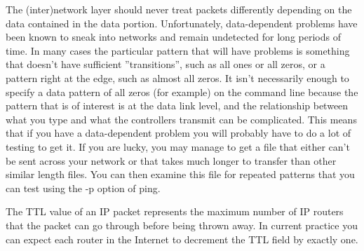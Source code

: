\vspace{4ex} \newline %
The (inter)network layer should never treat packets differently depending on the data contained in the data portion. 
Unfortunately, data-dependent problems have been known to sneak into networks and remain undetected for long periods of time. 
In many cases the particular pattern that will have problems is something that doesn't have sufficient ''transitions'', such as all ones or all zeros, or a pattern right at the edge, such as almost all zeros. 
It isn't necessarily enough to specify a data pattern of all zeros (for example) on the command line because the pattern that is of interest is at the data link level, and the relationship between what you type and what the controllers transmit can be complicated.
\vspace{1ex} \newline
This means that if you have a data-dependent problem you will probably have to do a lot of testing to get it. 
If you are lucky, you may manage to get a file that either can't be sent across your network or that takes much longer to transfer than other similar length files. 
You can then examine this file for repeated patterns that you can test using the -p option of ping.


The TTL value of an IP packet represents the maximum number of IP routers that the packet can go through before being thrown away. 
In current practice you can expect each router in the Internet to decrement the TTL field by exactly one.

